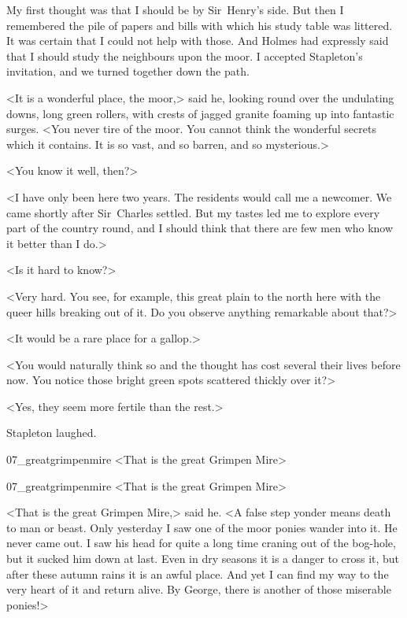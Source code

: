 My first thought was that I should be by Sir~Henry's side. But then I remembered the pile of papers and bills with which his study table was littered. It was certain that I could not help with those. And Holmes had expressly said that I should study the neighbours upon the moor. I accepted Stapleton's invitation, and we turned together down the path.

<It is a wonderful place, the moor,> said he, looking round over the undulating downs, long green rollers, with crests of jagged granite foaming up into fantastic surges. <You never tire of the moor. You cannot think the wonderful secrets which it contains. It is so vast, and so barren, and so mysterious.>

<You know it well, then?>

<I have only been here two years. The residents would call me a newcomer. We came shortly after Sir~Charles settled. But my tastes led me to explore every part of the country round, and I should think that there are few men who know it better than I do.>

<Is it hard to know?>

<Very hard. You see, for example, this great plain to the north here with the queer hills breaking out of it. Do you observe anything remarkable about that?>

<It would be a rare place for a gallop.>

<You would naturally think so and the thought has cost several their lives before now. You notice those bright green spots scattered thickly over it?>

<Yes, they seem more fertile than the rest.>

Stapleton laughed.


\begin{letter}
	\begin{bwbigpic}
			[1.0]  
		{07_greatgrimpenmire}
		{<That is the great Grimpen Mire>}
	\end{bwbigpic}
\end{letter}
\begin{a4}
	\begin{bwbigpic}
		[1.0] 
		{07_greatgrimpenmire}
		{<That is the great Grimpen Mire>}
	\end{bwbigpic}
\end{a4}


<That is the great Grimpen Mire,> said he. <A false step yonder means death to man or beast. Only yesterday I saw one of the moor ponies wander into it. He never came out. I saw his head for quite a long time craning out of the bog-hole, but it sucked him down at last. Even in dry seasons it is a danger to cross it, but after these autumn rains it is an awful place. And yet I can find my way to the very heart of it and return alive. By George, there is another of those miserable ponies!>

